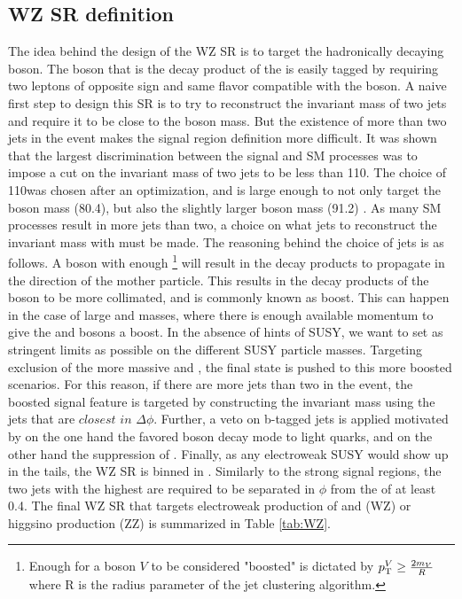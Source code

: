 \subsection{WZ SR definition}
The idea behind the design of the WZ SR is to target the hadronically decaying \PW boson. 
The \PZ boson that is the decay product of the \PSGczDt is easily tagged by requiring two leptons of opposite sign and same flavor compatible with the \PZ boson.
A naive first step to design this SR is to try to reconstruct the invariant mass of two jets and require it to be close to the \PW boson mass.
But the existence of more than two jets in the event makes the signal region definition more difficult. 
It was shown that the largest discrimination between the signal and SM processes was to impose a cut on the invariant mass of two jets to be less than 110\GeV. 
The choice of 110\GeV was chosen after an optimization, and is large enough to not only target the \PW boson mass (80.4\GeV), but also the slightly larger \PZ boson mass (91.2\GeV) \cite{PhysRevD.98.030001}. 
As many SM processes result in more jets than two, a choice on what jets to reconstruct the invariant mass with must be made. 
The reasoning behind the choice of jets is as follows. 
A \PW boson with enough \pt\footnote{Enough \pt for a boson $V$ to be considered "boosted" is dictated by $p_{\mathrm{T}}^{V}\geq\frac{2m_{V}}{R}$ where R is the radius parameter of the jet clustering algorithm.} will result in the decay products to propagate in the direction of the mother particle. 
This results in the decay products of the \PW boson to be more collimated, and is commonly known as boost. 
This can happen in the case of large \PSGczDt and \firstcharg masses, where there is enough available momentum to give the \PZ and \PW bosons a boost. 
In the absence of hints of SUSY, we want to set as stringent limits as possible on the different SUSY particle masses. 
Targeting exclusion of the more massive \PSGczDt and \firstcharg, the final state is pushed to this more boosted scenarios. 
For this reason, if there are more jets than two in the event, the boosted signal feature is targeted by constructing the invariant mass using the jets that are $closest$ $in$ $\Delta\phi$. 
Further, a veto on b-tagged jets is applied motivated by on the one hand the favored \PW boson decay mode to light quarks, and on the other hand the suppression of \ttbar. 
Finally, as any electroweak SUSY would show up in the \ptmiss tails, the WZ SR is binned in \ptmiss. 
Similarly to the strong signal regions, the two jets with the highest \pt are required to be separated in $\phi$ from the \ptmiss of at least 0.4.
The final WZ SR that targets electroweak production of \PSGczDt and \firstcharg (WZ) or higgsino production (ZZ) is summarized in Table \ref{tab:WZ}.    

